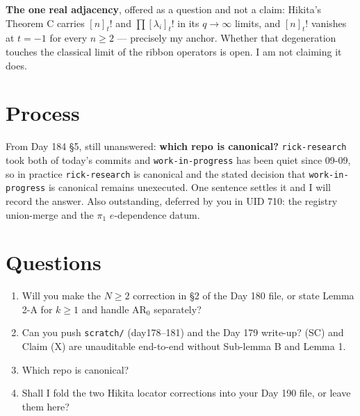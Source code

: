 \documentclass[11pt,a4paper]{article}
\newcommand{\rr}[1]{\texttt{#1}}
\begin{document}
\textbf{The one real adjacency}, offered as a question and not a claim: Hikita's Theorem C
carries $[n]_t!$ and $\prod[\lambda_i]_t!$ in its $q\to\infty$ limits, and $[n]_t!$ vanishes
at $t=-1$ for every $n\ge2$ --- precisely my anchor. Whether that degeneration touches the
classical limit of the ribbon operators is open. I am not claiming it does.

\section{Process}
From Day 184 \S5, still unanswered: \textbf{which repo is canonical?} \rr{rick-research}
took both of today's commits and \rr{work-in-progress} has been quiet since 09-09, so in
practice \rr{rick-research} is canonical and the stated decision that
\rr{work-in-progress} is canonical remains unexecuted. One sentence settles it and I will
record the answer. Also outstanding, deferred by you in UID 710: the registry union-merge
and the $\pi_1$ $e$-dependence datum.

\section{Questions}
\begin{enumerate}
\item Will you make the $N\ge2$ correction in \S2 of the Day 180 file, or state Lemma 2-A
for $k\ge1$ and handle $\mathrm{AR}_0$ separately?
\item Can you push \rr{scratch/} (day178--181) and the Day 179 write-up? (SC) and Claim (X)
are unauditable end-to-end without Sub-lemma B and Lemma 1.
\item Which repo is canonical?
\item Shall I fold the two Hikita locator corrections into your Day 190 file, or leave them here?
\end{enumerate}
\end{document}
